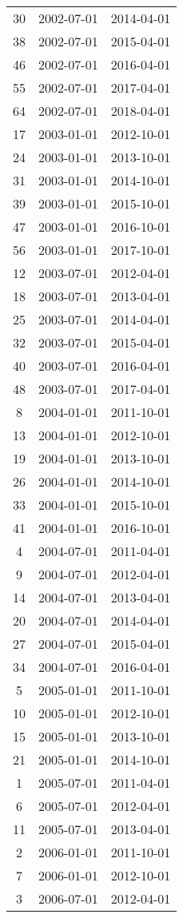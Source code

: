 \begin{tabular}{ccc}
  30 & 2002-07-01 & 2014-04-01 \\ 
  38 & 2002-07-01 & 2015-04-01 \\ 
  46 & 2002-07-01 & 2016-04-01 \\ 
  55 & 2002-07-01 & 2017-04-01 \\ 
  64 & 2002-07-01 & 2018-04-01 \\ 
  17 & 2003-01-01 & 2012-10-01 \\ 
  24 & 2003-01-01 & 2013-10-01 \\ 
  31 & 2003-01-01 & 2014-10-01 \\ 
  39 & 2003-01-01 & 2015-10-01 \\ 
  47 & 2003-01-01 & 2016-10-01 \\ 
  56 & 2003-01-01 & 2017-10-01 \\ 
  12 & 2003-07-01 & 2012-04-01 \\ 
  18 & 2003-07-01 & 2013-04-01 \\ 
  25 & 2003-07-01 & 2014-04-01 \\ 
  32 & 2003-07-01 & 2015-04-01 \\ 
  40 & 2003-07-01 & 2016-04-01 \\ 
  48 & 2003-07-01 & 2017-04-01 \\ 
  8 & 2004-01-01 & 2011-10-01 \\ 
  13 & 2004-01-01 & 2012-10-01 \\ 
  19 & 2004-01-01 & 2013-10-01 \\ 
  26 & 2004-01-01 & 2014-10-01 \\ 
  33 & 2004-01-01 & 2015-10-01 \\ 
  41 & 2004-01-01 & 2016-10-01 \\ 
  4 & 2004-07-01 & 2011-04-01 \\ 
  9 & 2004-07-01 & 2012-04-01 \\ 
  14 & 2004-07-01 & 2013-04-01 \\ 
  20 & 2004-07-01 & 2014-04-01 \\ 
  27 & 2004-07-01 & 2015-04-01 \\ 
  34 & 2004-07-01 & 2016-04-01 \\ 
  5 & 2005-01-01 & 2011-10-01 \\ 
  10 & 2005-01-01 & 2012-10-01 \\ 
  15 & 2005-01-01 & 2013-10-01 \\ 
  21 & 2005-01-01 & 2014-10-01 \\ 
  1 & 2005-07-01 & 2011-04-01 \\ 
  6 & 2005-07-01 & 2012-04-01 \\ 
  11 & 2005-07-01 & 2013-04-01 \\ 
  2 & 2006-01-01 & 2011-10-01 \\ 
  7 & 2006-01-01 & 2012-10-01 \\ 
  3 & 2006-07-01 & 2012-04-01 \\ 
   \hline
\end{tabular}
